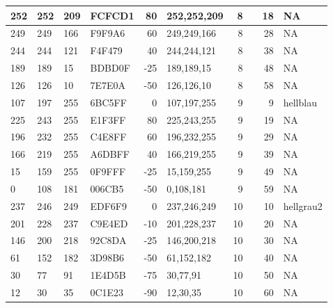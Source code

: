 \documentclass[
]{article}
\begin{document}
\begin{table}
\begin{tabular}[t]{l|l|l|l|r|l|r|l|r|l}
\hline
252 & 252 & 209 & FCFCD1 & 80 & 252,252,209 & 8 & \multicolumn{1}{c}{\cellcolor[HTML]{FCFCD1}{\textcolor{white}{\#FCFCD1}}} & 18 & NA\\
\hline
249 & 249 & 166 & F9F9A6 & 60 & 249,249,166 & 8 & \multicolumn{1}{c}{\cellcolor[HTML]{F9F9A6}{\textcolor{white}{\#F9F9A6}}} & 28 & NA\\
\hline
244 & 244 & 121 & F4F479 & 40 & 244,244,121 & 8 & \multicolumn{1}{c}{\cellcolor[HTML]{F4F479}{\textcolor{white}{\#F4F479}}} & 38 & NA\\
\hline
189 & 189 & 15 & BDBD0F & -25 & 189,189,15 & 8 & \multicolumn{1}{c}{\cellcolor[HTML]{BDBD0F}{\textcolor{white}{\#BDBD0F}}} & 48 & NA\\
\hline
126 & 126 & 10 & 7E7E0A & -50 & 126,126,10 & 8 & \multicolumn{1}{c}{\cellcolor[HTML]{7E7E0A}{\textcolor{white}{\#7E7E0A}}} & 58 & NA\\
\hline
107 & 197 & 255 & 6BC5FF & 0 & 107,197,255 & 9 & \multicolumn{1}{c}{\cellcolor[HTML]{6BC5FF}{\textcolor{white}{\#6BC5FF}}} & 9 & hellblau\\
\hline
225 & 243 & 255 & E1F3FF & 80 & 225,243,255 & 9 & \multicolumn{1}{c}{\cellcolor[HTML]{E1F3FF}{\textcolor{white}{\#E1F3FF}}} & 19 & NA\\
\hline
196 & 232 & 255 & C4E8FF & 60 & 196,232,255 & 9 & \multicolumn{1}{c}{\cellcolor[HTML]{C4E8FF}{\textcolor{white}{\#C4E8FF}}} & 29 & NA\\
\hline
166 & 219 & 255 & A6DBFF & 40 & 166,219,255 & 9 & \multicolumn{1}{c}{\cellcolor[HTML]{A6DBFF}{\textcolor{white}{\#A6DBFF}}} & 39 & NA\\
\hline
15 & 159 & 255 & 0F9FFF & -25 & 15,159,255 & 9 & \multicolumn{1}{c}{\cellcolor[HTML]{0F9FFF}{\textcolor{white}{\#0F9FFF}}} & 49 & NA\\
\hline
0 & 108 & 181 & 006CB5 & -50 & 0,108,181 & 9 & \multicolumn{1}{c}{\cellcolor[HTML]{006CB5}{\textcolor{white}{\#006CB5}}} & 59 & NA\\
\hline
237 & 246 & 249 & EDF6F9 & 0 & 237,246,249 & 10 & \multicolumn{1}{c}{\cellcolor[HTML]{EDF6F9}{\textcolor{white}{\#EDF6F9}}} & 10 & hellgrau2\\
\hline
201 & 228 & 237 & C9E4ED & -10 & 201,228,237 & 10 & \multicolumn{1}{c}{\cellcolor[HTML]{C9E4ED}{\textcolor{white}{\#C9E4ED}}} & 20 & NA\\
\hline
146 & 200 & 218 & 92C8DA & -25 & 146,200,218 & 10 & \multicolumn{1}{c}{\cellcolor[HTML]{92C8DA}{\textcolor{white}{\#92C8DA}}} & 30 & NA\\
\hline
61 & 152 & 182 & 3D98B6 & -50 & 61,152,182 & 10 & \multicolumn{1}{c}{\cellcolor[HTML]{3D98B6}{\textcolor{white}{\#3D98B6}}} & 40 & NA\\
\hline
30 & 77 & 91 & 1E4D5B & -75 & 30,77,91 & 10 & \multicolumn{1}{c}{\cellcolor[HTML]{1E4D5B}{\textcolor{white}{\#1E4D5B}}} & 50 & NA\\
\hline
12 & 30 & 35 & 0C1E23 & -90 & 12,30,35 & 10 & \multicolumn{1}{c}{\cellcolor[HTML]{0C1E23}{\textcolor{white}{\#0C1E23}}} & 60 & NA\\
\hline
\end{tabular}
\end{table}
\end{document}
